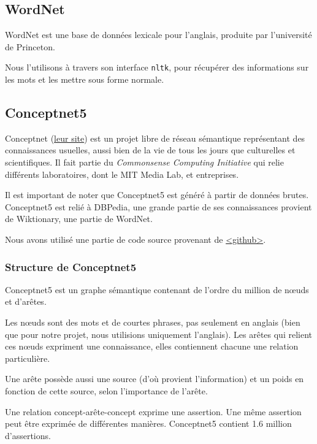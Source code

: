 \documentclass[a4paper, 12pt]{article}
\newcommand{\pyt}[1]{\texttt{#1}}%
\newcommand{\ang}[1]{\textit{#1}}%
\begin{document}
\subsection{WordNet}\label{Subsection:WordNet}

WordNet est une base de données lexicale pour l'anglais, produite par l'université de Princeton.

Nous l'utilisons à travers son interface \pyt{nltk}, pour récupérer des informations sur les mots et les mettre sous forme normale.


\subsection{Conceptnet5}\label{Subsection:Conceptnet5}

Conceptnet (\href{http://conceptnet5.media.mit.edu/}{leur site}) est un projet libre de réseau sémantique représentant des connaissances usuelles, aussi bien de la vie de tous les jours que culturelles et scientifiques. Il fait partie du \ang{Commonsense Computing Initiative} qui relie différents laboratoires, dont le MIT Media Lab, et entreprises.

Il est important de noter que Conceptnet5 est généré à partir de données brutes. Conceptnet5 est relié à DBPedia, une grande partie de ses connaissances provient de Wiktionary, une partie de WordNet.

Nous avons utilisé une partie de code source provenant de \href{https://github.com/commonsense/conceptnet5}{<github>}.


\subsubsection{Structure de Conceptnet5}

Conceptnet5 est un graphe sémantique contenant de l'ordre du million de nœuds et d'ar\^etes.

Les n\oe{}uds sont des mots et de courtes phrases, pas seulement en anglais (bien que pour notre projet, nous utilisions uniquement l'anglais). Les arêtes qui relient ces n\oe{}uds expriment une connaissance, elles contiennent chacune une relation particulière.

Une arête possède aussi une source (d'où provient l'information) et un poids en fonction de cette source, selon l'importance de l'arête.

Une relation concept-arête-concept exprime une assertion. Une même assertion peut être exprimée de différentes manières. Conceptnet5 contient 1.6 million d'assertions.
\end{document}
